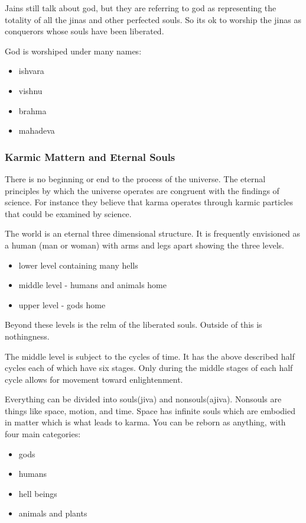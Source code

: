 \documentclass{article}
\begin{document}
Jains still talk about god, but they are referring to god as representing the totality of all the jinas and other perfected souls. So its ok to worship the jinas as conquerors whose souls have been liberated.

God is worshiped under many names:
\begin{itemize}
	\item ishvara
	\item vishnu
	\item brahma
	\item mahadeva
\end{itemize}

\subsubsection*{Karmic Mattern and Eternal Souls}
\label{ssub:karmic_mattern_and_eternal_souls}
There is no beginning or end to the process of the universe. The eternal principles by which the universe operates are congruent with the findings of science. For instance they believe that karma operates through karmic particles that could be examined by science.

The world is an eternal three dimensional structure. It is frequently envisioned as a human (man or woman) with arms and legs apart showing the three levels.
\begin{itemize}
	\item lower level containing many hells
	\item middle level - humans and animals home
	\item upper level - gods home
\end{itemize}
Beyond these levels is the relm of the liberated souls. Outside of this is nothingness.

The middle level is subject to the cycles of time. It has the above described half cycles each of which have six stages. Only during the middle stages of each half cycle allows for movement toward enlightenment.

Everything can be divided into souls(jiva) and nonsouls(ajiva). Nonsouls are things like space, motion, and time. Space has infinite souls which are embodied in matter which is what leads to karma. You can be reborn as anything, with four main categories:
\begin{itemize}
	\item gods
	\item humans
	\item hell beings
	\item animals and plants
\end{itemize}
\end{document}
